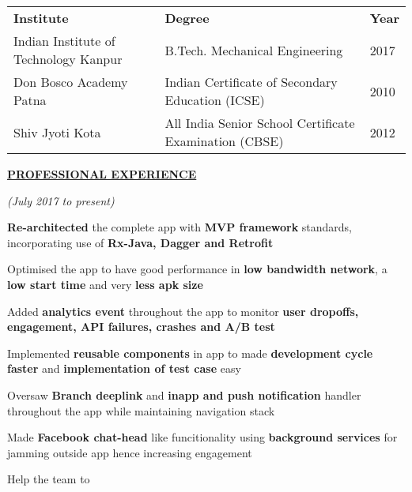 \documentclass[a4paper]{deedy-resume} %
\begin{document}
\begin{tabular}{|l|l|l|}
\cline{1-3}
\rule{0pt}{2.2ex}
\textbf{\hspace{60pt}Institute\hspace{90pt}}&\textbf{\hspace{120pt}Degree\hspace{120pt} }&\textbf{\hspace{20pt}Year\hspace{20pt} }\\
\cline{1-3}
\rule{0pt}{2.2ex}
\hspace{6pt}Indian Institute of Technology Kanpur        \hspace{10pt}&\hspace{74pt}B.Tech. Mechanical Engineering&\hspace{20pt}2017 \\
\hspace{26pt}Don Bosco Academy Patna&\hspace{32pt}Indian Certificate of Secondary Education (ICSE)\hspace{17pt}&\hspace{20pt}2010\\
\hspace{47pt}Shiv Jyoti Kota\hspace{45pt}&\hspace{20pt}All India Senior School Certificate Examination (CBSE)&\hspace{20pt}2012\\
\cline{1-3}
\end{tabular}
\sectionspace

{\uppercase\uline{\textbf{\large{Professional Experience}}\hfill}}
\microspace


\hfill {\textit{\small(July 2017 to present)}}\\

\begin{tightitemize}
\item \textbf{Re-architected} the complete app with \textbf{MVP framework} standards, incorporating use of \textbf{Rx-Java, Dagger and Retrofit}
\item Optimised the app to have good performance in \textbf{low bandwidth network}, a \textbf{low start time} and very \textbf{less apk size}
\item Added \textbf{analytics event} throughout the app to monitor \textbf{user dropoffs, engagement, API failures, crashes and A/B test}
\item Implemented \textbf{reusable components} in app to made \textbf{development cycle faster} and \textbf{implementation of test case} easy
\item  Oversaw \textbf{Branch deeplink} and \textbf{inapp and push notification} handler throughout the app while maintaining navigation stack
\item Made \textbf{Facebook chat-head} like funcitionality using \textbf{background services} for jamming outside app hence increasing engagement
\item Help the team to 
\end{tightitemize}
\microspace
\end{document}
